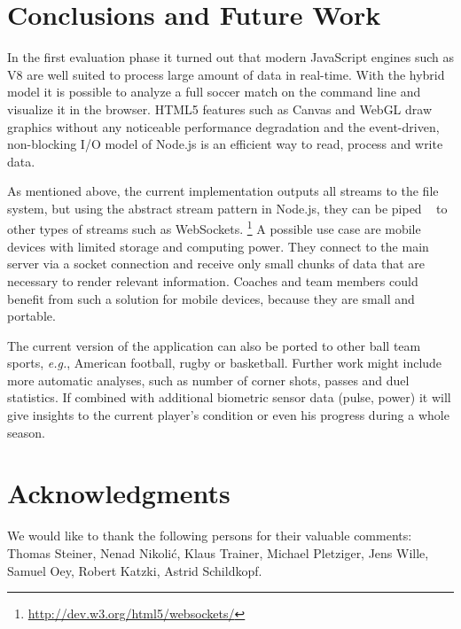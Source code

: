 \documentclass{sig-alternate}
\newcommand{\inlinelistingsize}{\fontsize{8pt}{11pt}}
\let\oldurl\url
\renewcommand{\url}[1]{\inlinelistingsize\oldurl{#1}}
\begin{document}
\section{Conclusions and Future Work}
\label{sec:conclusions-future-work}

In the first evaluation phase it turned out
that modern JavaScript engines such as V8
are well suited to process large amount of data in real-time.
With the hybrid model it is possible to analyze a full soccer match
on the command line and visualize it in the browser.
HTML5 features such as Canvas and WebGL draw graphics
without any noticeable performance degradation
and the event-driven, non-blocking I/O model of Node.js
is an efficient way to read, process and write data.

As mentioned above, the current implementation
outputs all streams to the file system,
but using the abstract stream pattern in Node.js,
they can be piped%
~\cite{ogden2012nodestreams}
to other types of streams such as WebSockets.%
\footnote{\url{http://dev.w3.org/html5/websockets/}}
A possible use case are mobile devices with limited storage
and computing power.
They connect to the main server via a socket connection
and receive only small chunks of data that are necessary
to render relevant information.
Coaches and team members could benefit from such a solution
for mobile devices, because they are small and portable.

The current version of the application can also be ported
to other ball team sports, \emph{e.g.}, American football,
rugby or basketball.
Further work might include more automatic analyses,
such as number of corner shots, passes and duel statistics.
If combined with additional biometric sensor data (pulse, power)
it will give insights to the current player’s condition
or even his progress during a whole season.

\section*{Acknowledgments}
We would like to thank the following persons for their valuable comments: Thomas Steiner, Nenad Nikolić, Klaus Trainer, Michael Pletziger, Jens Wille, Samuel Oey, Robert Katzki, Astrid Schildkopf.



\end{document}
